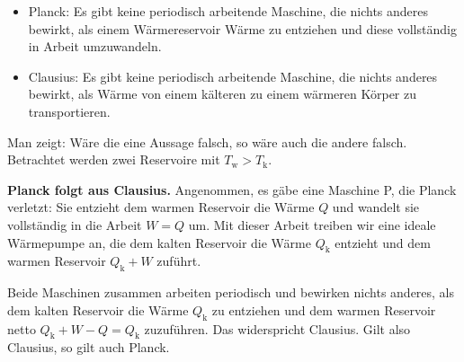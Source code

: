 \begin{itemize}
\item Planck: Es gibt keine periodisch arbeitende Maschine, die nichts anderes bewirkt, als einem Wärmereservoir Wärme zu entziehen und diese vollständig in Arbeit umzuwandeln.
\item Clausius: Es gibt keine periodisch arbeitende Maschine, die nichts anderes bewirkt, als Wärme von einem kälteren zu einem wärmeren Körper zu transportieren.
\end{itemize}
Man zeigt: Wäre die eine Aussage falsch, so wäre auch die andere falsch. Betrachtet werden zwei Reservoire mit $T_\text{w} > T_\text{k}$.

\textbf{Planck folgt aus Clausius.} Angenommen, es gäbe eine Maschine P, die Planck verletzt: Sie entzieht dem warmen Reservoir die Wärme $Q$ und wandelt sie vollständig in die Arbeit $W = Q$ um. Mit dieser Arbeit treiben wir eine ideale Wärmepumpe an, die dem kalten Reservoir die Wärme $Q_\text{k}$ entzieht und dem warmen Reservoir $Q_\text{k}+W$ zuführt.
\begin{center}
\end{center}
Beide Maschinen zusammen arbeiten periodisch und bewirken nichts anderes, als dem kalten Reservoir die Wärme $Q_\text{k}$ zu entziehen und dem warmen Reservoir netto $Q_\text{k}+W-Q = Q_\text{k}$ zuzuführen. Das widerspricht Clausius. Gilt also Clausius, so gilt auch Planck.

